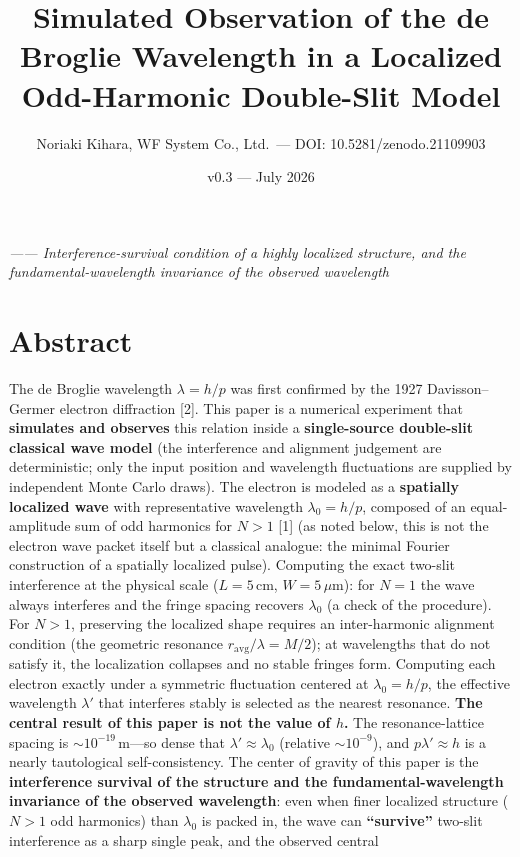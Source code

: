 \documentclass[11pt,a4paper]{article}
\title{Simulated Observation of the de Broglie Wavelength in a Localized
Odd-Harmonic Double-Slit Model}
\author{Noriaki Kihara, WF System Co., Ltd.~--- DOI:
10.5281/zenodo.21109903}
\date{v0.3 --- July 2026}
\begin{document}
\maketitle
\emph{------ Interference-survival condition of a highly localized
structure, and the fundamental-wavelength invariance of the observed
wavelength}

\section{Abstract}\label{abstract}

The de Broglie wavelength \(\lambda=h/p\) was first confirmed by the
1927 Davisson--Germer electron diffraction {[}2{]}. This paper is a
numerical experiment that \textbf{simulates and observes} this relation
inside a \textbf{single-source double-slit classical wave model} (the
interference and alignment judgement are deterministic; only the input
position and wavelength fluctuations are supplied by independent Monte
Carlo draws). The electron is modeled as a \textbf{spatially localized
wave} with representative wavelength \(\lambda_0=h/p\), composed of an
equal-amplitude sum of odd harmonics for \(N>1\) {[}1{]} (as noted
below, this is not the electron wave packet itself but a classical
analogue: the minimal Fourier construction of a spatially localized
pulse). Computing the exact two-slit interference at the physical scale
(\(L=5\,\mathrm{cm}\), \(W=5\,\mu\mathrm{m}\)): for \(N=1\) the wave
always interferes and the fringe spacing recovers \(\lambda_0\) (a check
of the procedure). For \(N>1\), preserving the localized shape requires
an inter-harmonic alignment condition (the geometric resonance
\(r_{\mathrm{avg}}/\lambda=M/2\)); at wavelengths that do not satisfy
it, the localization collapses and no stable fringes form. Computing
each electron exactly under a symmetric fluctuation centered at
\(\lambda_0=h/p\), the effective wavelength \(\lambda'\) that interferes
stably is selected as the nearest resonance. \textbf{The central result
of this paper is not the value of \(h\).} The resonance-lattice spacing
is \(\sim10^{-19}\,\mathrm{m}\)---so dense that
\(\lambda'\approx\lambda_0\) (relative \(\sim10^{-9}\)), and
\(p\lambda'\approx h\) is a nearly tautological self-consistency. The
center of gravity of this paper is the \textbf{interference survival of
the structure and the fundamental-wavelength invariance of the observed
wavelength}: even when finer localized structure (\(N>1\) odd harmonics)
than \(\lambda_0\) is packed in, the wave can \textbf{``survive''}
two-slit interference as a sharp single peak, and the observed central
\end{document}
